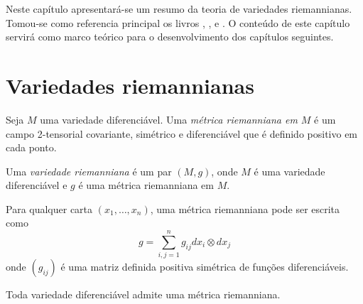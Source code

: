 Neste capítulo apresentará-se um resumo da teoria de variedades riemannianas.
Tomou-se como referencia principal os livros \cite{Lee2012}, \cite{Lee1997}, \cite{Carmo1988} e \cite{Gallot2004}.
O conteúdo de este capítulo servirá como marco teórico para o desenvolvimento dos capítulos seguintes.

\section{Variedades riemannianas}

\begin{definicao}
	Seja $M$ uma variedade diferenciável. Uma \emph{métrica riemanniana em $M$} é um campo 2-tensorial covariante, simétrico e diferenciável que é definido positivo em cada ponto.	
\end{definicao}

\begin{definicao}
	Uma \emph{variedade riemanniana} é um par $(M,g)$, onde $M$ é uma variedade diferenciável e $g$ é uma métrica riemanniana em $M$.
\end{definicao}

\begin{observacao}
	Para qualquer carta $(x_1, \ldots, x_n)$, uma métrica riemanniana pode ser escrita como
	\begin{equation*}
		g = \sum_{i,j=1}^n g_{ij} dx_i \otimes dx_j
	\end{equation*}
	onde $(g_{ij})$ é uma matriz definida positiva simétrica de funções diferenciáveis.
\end{observacao}

\begin{proposicao}
Toda variedade diferenciável admite uma métrica riemanniana.
\end{proposicao}


